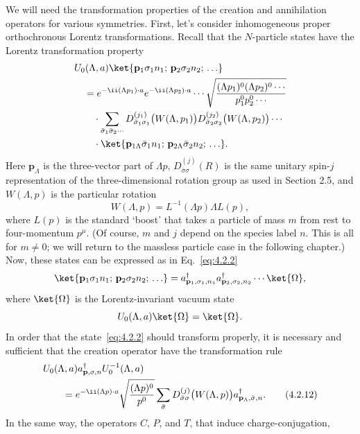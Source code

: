 We will need the transformation properties of the creation and annihilation
operators for various symmetries. First, let's consider inhomogeneous
proper orthochronous Lorentz transformations. Recall that the $N$-particle
states have the Lorentz transformation property
\begin{align*}
  &U_0(\Lambda,a)\ket{\mathbf p_1\sigma_1n_1;\,\mathbf p_2\sigma_2n_2;\,\ldots}
  \\
  &\quad={}
  e^{-\ii(\Lambda p_1)\cdot a}e^{-\ii(\Lambda p_2)\cdot a}\cdots
  \sqrt{\frac{(\Lambda p_1)^0(\Lambda p_2)^0\cdots}{p_1^0p_2^0\cdots}}
  \notag\\
  &\qquad\cdot\sum_{\bar\sigma_1\bar\sigma_2\cdots}
  D_{\bar\sigma_1\sigma_1}^{(j_1)}\bigl(W(\Lambda,p_1)\bigr)
  D_{\bar\sigma_2\sigma_2}^{(j_2)}\bigl(W(\Lambda,p_2)\bigr)\cdots
  \notag\\
  &\qquad\cdot
  \ket{\mathbf p_{1\Lambda}\bar\sigma_1n_1;\,
       \mathbf p_{2\Lambda}\bar\sigma_2n_2;\,\ldots}.
\end{align*}
Here $\mathbf p_\Lambda$ is the three-vector part of $\Lambda p$, $D_{\bar\sigma\sigma}^{(j)}(R)$ is the same unitary spin-$j$
representation of the three-dimensional rotation group as used in Section
2.5, and $W(\Lambda,p)$ is the particular rotation
\[
  W(\Lambda,p)=L^{-1}(\Lambda p)\Lambda L(p),
\]
where $L(p)$ is the standard `boost' that takes a particle of mass $m$ from rest
to four-momentum $p^\mu$. (Of course, $m$ and $j$ depend on the species label $n$.
This is all for $m\ne0$; we will return to the massless particle case in the
following chapter.) Now, these states can be expressed as in Eq.~\eqref{eq:4.2.2}
\[
  \ket{\mathbf p_1\sigma_1n_1;\,\mathbf p_2\sigma_2n_2;\,\ldots}
  =a^\dagger_{\mathbf p_1,\sigma_1,n_1}a^\dagger_{\mathbf p_2,\sigma_2,n_2}\cdots
  \ket{\Omega},
\]
where $\ket{\Omega}$ is the Lorentz-invariant vacuum state
\[
  U_0(\Lambda,a)\ket{\Omega}=\ket{\Omega}.
\]
In order that the state~\eqref{eq:4.2.2} should transform properly, it is necessary
and sufficient that the creation operator have the transformation rule
\begin{align}
  &U_0(\Lambda,a)a^\dagger_{\mathbf p,\sigma,n}U_0^{-1}(\Lambda,a)
  \notag\\
  &\qquad={}
  e^{-\ii(\Lambda p)\cdot a}\sqrt{\frac{(\Lambda p)^0}{p^0}}
  \sum_{\bar\sigma}D_{\bar\sigma\sigma}^{(j)}\bigl(W(\Lambda,p)\bigr)
  a^\dagger_{\mathbf p_\Lambda,\bar\sigma,n}.
  \tag{4.2.12}
  \label{eq:4.2.12}
\end{align}
In the same way, the operators $C$, $P$, and $T$, that induce charge-conjugation,
